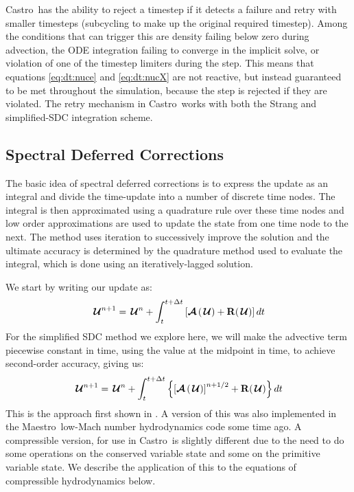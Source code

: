 \documentclass[times,modern]{aastex63}
\newcommand{\castro}{{\sf Castro}}
\newcommand{\maestro}{{\sf Maestro}}
\newcommand{\Uc}{{\,\bm{\mathcal{U}}}}
\newcommand{\Rb}{{\bf R}}
\newcommand{\Adv}[1]{{\left [\boldsymbol{\mathcal{A}} \left(#1\right)\right]}}
\newcommand{\Advs}[1]{\boldsymbol{\mathcal{A}} \left(#1\right)}
\begin{document}
\castro\ has the ability to reject a timestep if it detects a failure
and retry with smaller timesteps (subcycling to make up the original
required timestep).  Among the conditions that can trigger this are
density failing below zero during advection, the ODE integration
failing to converge in the implicit solve, or violation of one of the
timestep limiters during the step.  This means that equations
\ref{eq:dt:nuce} and \ref{eq:dt:nucX} are not reactive, but instead
guaranteed to be met throughout the simulation, because the step is
rejected if they are violated.  The retry mechanism in \castro\ works
with both the Strang and simplified-SDC integration scheme.


\subsection{Spectral Deferred Corrections}

The basic idea of spectral deferred corrections is to express the
update as an integral and divide the time-update into a number of
discrete time nodes.  The integral is then approximated using a
quadrature rule over these time nodes and low order approximations are
used to update the state from one time node to the next.  The method
uses iteration to successively improve the solution and the ultimate
accuracy is determined by the quadrature method used to evaluate the
integral, which is done using an iteratively-lagged solution.

We start by writing our update as:
\begin{equation}
\Uc^{n+1} = \Uc^n + \int_t^{t+\Delta t} \left [ \Advs{\Uc} + \Rb(\Uc) \right ] dt
\end{equation}
For the simplified SDC method we explore here, we will make the
advective term piecewise constant in time, using the value at the
midpoint in time, to achieve second-order accuracy, giving us:
\begin{equation}
\label{eq:integral:simplesdc}
\Uc^{n+1} = \Uc^n + \int_t^{t+\Delta t} \left \{ \Adv{\Uc}^{n+1/2} + \Rb(\Uc) \right \} dt
\end{equation}
This is the approach first shown in \citep{SDC-old}.  A
version of this was also implemented in the \maestro\ low-Mach number
hydrodynamics code some time ago.  A compressible version, for use in
\castro\ is slightly different due to the need to do some operations
on the conserved variable state and some on the primitive variable
state.  We describe the application of this to the equations of
compressible hydrodynamics below.
\end{document}
